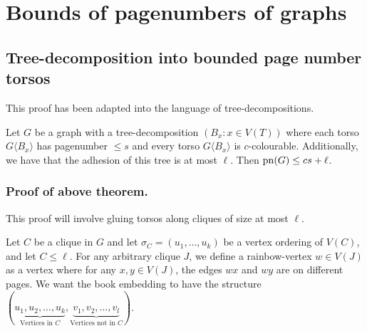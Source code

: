 \section{Bounds of pagenumbers of graphs}\label{sec:BoundedPagenumber} 
\subsection{Tree-decomposition into bounded page number torsos}\label{ssec:Clique_sum_Pagenumber_bound}

This proof has been adapted into the language of tree-decompositions. 
\begin{theorem}\label{thm:clique_sum_pagenumber_bound}
	Let \(G\) be a graph with a tree-decomposition \((B_x: x \in V(T))\) where each torso \(G \langle B_x \rangle\) has pagenumber \(\leq s\) and every torso \(G \langle B_x \rangle\) is \(c\)-colourable. Additionally, we have that the adhesion of this tree is at most \(\ell\).
	Then \(\operatorname{pn}(G) \leq cs + \ell \).  
\end{theorem}

\subsubsection{Proof of above theorem.}
This proof will involve gluing torsos along cliques of size at most \( \ell \). 

Let \(C\) be a clique in \(G\) and let \(\sigma_C = (u_1, \ldots , u_k)\) be a vertex ordering of \(V(C)\), and let \(C \leq \ell \). For any arbitrary clique \(J\), we define a rainbow-vertex \(w \in V(J)\) as a vertex where for any \(x, y \in V(J)\), the edges \(wx\) and \(wy\) are on different pages. We want the book embedding to have the structure \((\underbrace{u_1, u_2, \ldots, u_k}_{\text{Vertices in } C}, \underbrace{v_1, v_2, \ldots, v_l}_{\text{Vertices not in }C})\). 


